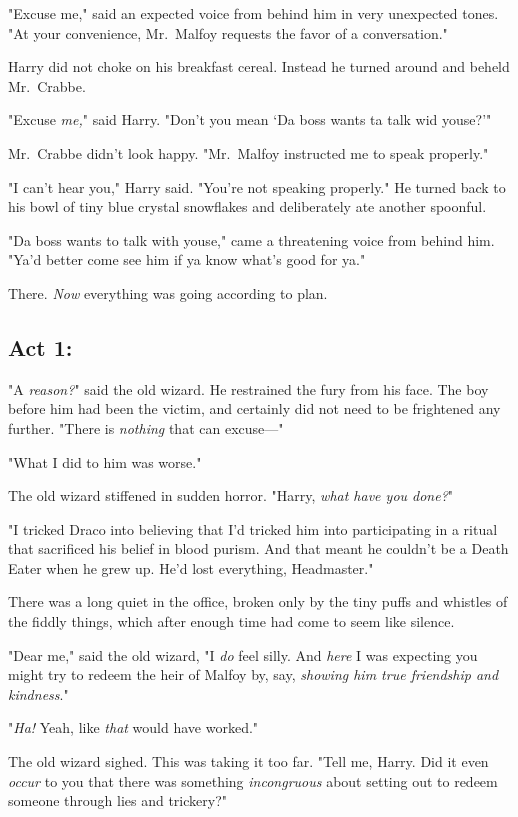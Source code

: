 "Excuse me," said an expected voice from behind him in very unexpected tones.
"At your convenience, Mr.~Malfoy requests the favor of a conversation."

Harry did not choke on his breakfast cereal. Instead he turned around and
beheld Mr.~Crabbe.

"Excuse \emph{me,}" said Harry. "Don't you mean `Da boss wants ta talk wid
youse?'"

Mr.~Crabbe didn't look happy. "Mr.~Malfoy instructed me to speak properly."

"I can't hear you," Harry said. "You're not speaking properly." He turned back
to his bowl of tiny blue crystal snowflakes and deliberately ate another
spoonful.

"Da boss wants to talk with youse," came a threatening voice from behind him.
"Ya'd better come see him if ya know what's good for ya."

There. \emph{Now} everything was going according to plan.
\sbreak
\subsection{Act 1:}

"A \emph{reason?}" said the old wizard. He restrained the fury from his face.
The boy before him had been the victim, and certainly did not need to be
frightened any further. "There is \emph{nothing} that can excuse\mbox{---}"

"What I did to him was worse."

The old wizard stiffened in sudden horror. "Harry, \emph{what have you done?}"

"I tricked Draco into believing that I'd tricked him into participating in a
ritual that sacrificed his belief in blood purism. And that meant he couldn't
be a Death Eater when he grew up. He'd lost everything, Headmaster."

There was a long quiet in the office, broken only by the tiny puffs and
whistles of the fiddly things, which after enough time had come to seem like
silence.

"Dear me," said the old wizard, "I \emph{do} feel silly. And \emph{here} I was
expecting you might try to redeem the heir of Malfoy by, say, \emph{showing him
true friendship and kindness}."

"\emph{Ha!} Yeah, like \emph{that} would have worked."

The old wizard sighed. This was taking it too far. "Tell me, Harry. Did it even
\emph{occur} to you that there was something \emph{incongruous} about setting
out to redeem someone through lies and trickery?"

